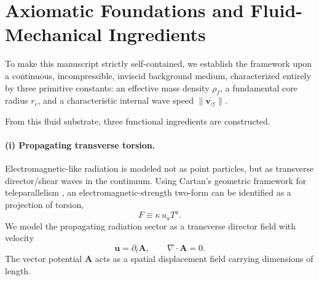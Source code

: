 \documentclass[11pt,a4paper]{article}
\begin{document}
    \section{Axiomatic Foundations and Fluid-Mechanical Ingredients}
    \label{sec:axiomatic}
        To make this manuscript strictly self-contained, we establish the framework upon a continuous, incompressible, inviscid background medium, characterized entirely by three primitive constants: an effective mass density $\rho_{\!f}$, a fundamental core radius $r_c$, and a characteristic internal wave speed $\lVert \mathbf{v}_{\!\boldsymbol{\circlearrowleft}}\rVert$.
        
        From this fluid substrate, three functional ingredients are constructed.
        
        \paragraph{(i) Propagating transverse torsion.} Electromagnetic-like radiation is modeled not as point particles, but as transverse director/shear waves in the continuum. Using Cartan's geometric framework for teleparallelism \cite{HehlObukhov2007}, an electromagnetic-strength two-form can be identified as a projection of torsion,
            \begin{equation}
                \label{eq:Ftorsion}
                F \equiv \kappa\,u_a T^a.
            \end{equation}
            We model the propagating radiation sector as a transverse director field with velocity
            \begin{equation}
                \label{eq:uA}
                \mathbf{u}=\partial_t \mathbf{A},
                \qquad
                \nabla\cdot \mathbf{A}=0.
            \end{equation}
            The vector potential $\mathbf{A}$ acts as a spatial displacement field carrying dimensions of length.
        
\end{document}
